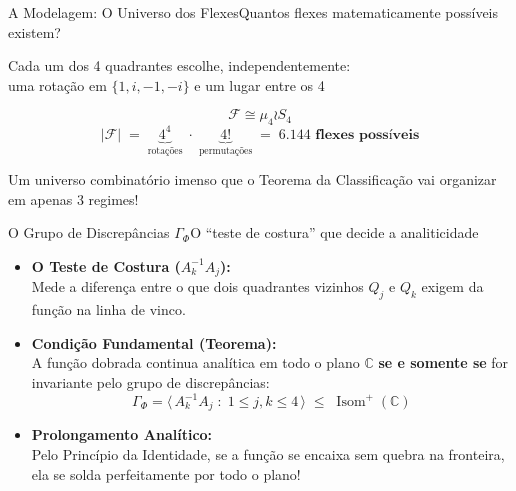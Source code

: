\documentclass[aspectratio=169, 11pt, utf8]{beamer}
\begin{document}
\begin{frame}{A Modelagem: O Universo dos Flexes}{Quantos flexes matematicamente possíveis existem?}
  \begin{center}
    \vspace{0.2cm}
    {\normalsize Cada um dos 4 quadrantes escolhe, independentemente:}\\[6pt]
    {\large uma rotação em $\{1, i, -1, -i\}$ \quad e \quad um lugar entre os 4}
    \vspace{0.4cm}

    \[ \mathcal{F} \cong \mu_4 \wr S_4 \]
    \[ |\mathcal{F}| \;=\; \underbrace{4^4}_{\text{rotações}} \;\cdot\;
       \underbrace{4!}_{\text{permutações}} \;=\; \mathbf{6.144 \text{ flexes possíveis}} \]

    \vspace{0.3cm}
    {\small\color{EnimarTeal} Um universo combinatório imenso que o Teorema da
    Classificação vai organizar em apenas 3 regimes!}
  \end{center}
\end{frame}

\begin{frame}{O Grupo de Discrepâncias $\Gamma_\Phi$}{O ``teste de costura'' que decide a analiticidade}
  \small
  \begin{itemize}
    \setlength{\itemsep}{10pt}
    \item \textbf{O Teste de Costura ($A_k^{-1} A_j$):}\\
    Mede a diferença entre o que dois quadrantes vizinhos $Q_j$ e $Q_k$ exigem da função na linha de vinco.

    \item \textbf{Condição Fundamental (Teorema):}\\
    A função dobrada continua analítica em todo o plano $\mathbb{C}$ \textbf{se e somente se} for invariante pelo grupo de discrepâncias:
    \[ \Gamma_\Phi = \big\langle\, A_k^{-1} A_j \;:\; 1 \le j,k \le 4 \,\big\rangle \;\le\; \operatorname{Isom}^+(\mathbb{C}) \]

    \item \textbf{Prolongamento Analítico:}\\
    Pelo Princípio da Identidade, se a função se encaixa sem quebra na fronteira, ela se solda perfeitamente por todo o plano!
  \end{itemize}
\end{frame}
\end{document}
